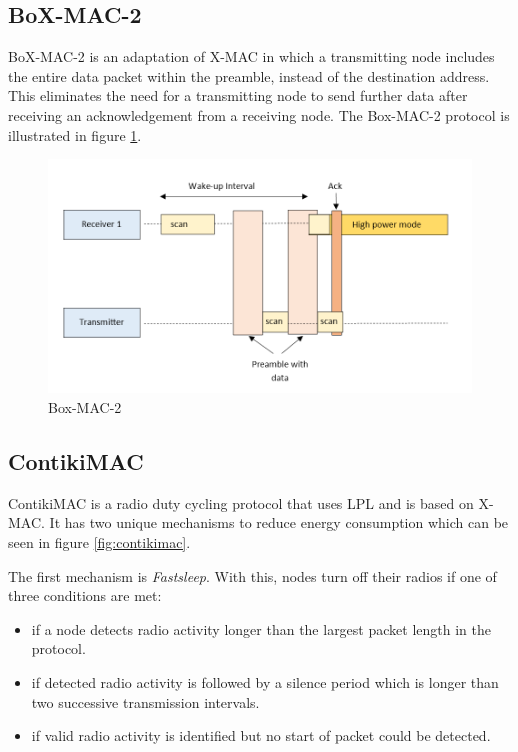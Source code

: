      \subsection{BoX-MAC-2} \label{box_mac}
    BoX-MAC-2 \cite{BOX_MAC} is an adaptation of X-MAC in which a transmitting node
    includes the entire data packet within the preamble, instead of the destination
    address. This eliminates the need for a transmitting node to send further
    data after receiving an acknowledgement from a receiving node. The Box-MAC-2 protocol
    is illustrated in figure \ref{fig:boxmac2}.

    \FloatBarrier
    \begin{figure}[ht]
      \includegraphics[width=\textwidth]{Images/chapter2/boxmac2.png}
      \caption{Box-MAC-2}
      \label{fig:boxmac2}
    \end{figure}
    \FloatBarrier

      \subsection{ContikiMAC}
    ContikiMAC \cite{ContikiMAC} is a radio duty cycling protocol that uses LPL and is based on
    X-MAC. It has two unique mechanisms to reduce energy consumption which can be
    seen in figure \ref{fig:contikimac}.

    The first mechanism is \textit{Fastsleep}. With this, nodes turn off their radios if one
    of three conditions are met:
    \begin{itemize}
      \item if a node detects radio activity longer than the largest packet length
      in the protocol.
      \item if detected radio activity is followed by a silence period which is
      longer than two successive transmission intervals.
      \item if valid radio activity is identified but no start of packet could be
      detected.
    \end{itemize}

